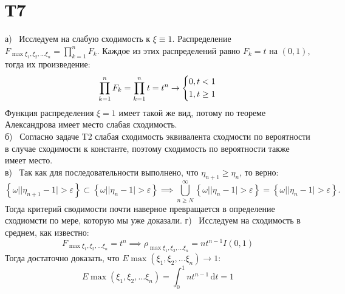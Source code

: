 \documentclass[12pt]{article}
\begin{document}
\section{Т7}
а) \, Исследуем на слабую сходимость к $\xi \equiv 1$. 
Распределение $F_{\max \xi_1, \xi_2, \dots \xi_n} = \prod_{k=1}^{n} F_k$. 
Каждое из этих распределений равно $F_k = t$ на $(0, 1)$, тогда их произведение: 
\[
    \prod_{k=1}^n F_k = \prod_{k=1}^n t = t^n \to 
    \begin{dcases}
        0, t < 1 \\
        1, t \geq 1
    \end{dcases}
\]  
Функция распределения $\xi = 1$ имеет такой же вид, потому по теореме Александрова имеет место слабая 
сходимость. \\
б) \, Согласно задаче T2 слабая сходимость эквивалента сходмости по вероятности в случае сходимости к константе, 
поэтому сходимость по вероятности также имеет место. \\
в) \, Так как для последовательности выполнено, что $\eta_{n + 1} \geq \eta_{n}$, то верно: 
\[
    \left\{ \omega \mid \vert \eta_{n+1} - 1 \vert > \varepsilon \right\} \subset \left\{ \omega \mid \vert \eta_{n} - 1 \vert > \varepsilon \right\} \implies 
    \bigcup_{n \geq N}^{\infty} \left\{ \omega \mid \vert \eta_n - 1 \vert > \varepsilon \right\} = \left\{ \omega \mid \vert \eta_n - 1 \vert > \varepsilon \right\}. 
\] 
Тогда критерий сводимости почти наверное превращается в определение сходиомсти по мере, которую мы уже доказали.
г) \, Исследуем на сходимость в среднем, как известно: 
\[
    F_{\max \xi_1, \xi_2, \dots \xi_n} = t^n \implies \rho_{\max \xi_1, \xi_2, \dots \xi_n} = 
    n t^{n-1} I(0, 1)
\] 
Тогда достаточно доказать, что $E \max (\xi_1, \xi_2, \dots \xi_n) \to 1$: 
\[
    E \max (\xi_1, \xi_2, \dots \xi_n) = \int_{0}^{1} n t^{n-1} \,\mathrm{d}t = 1
\]
\end{document}
